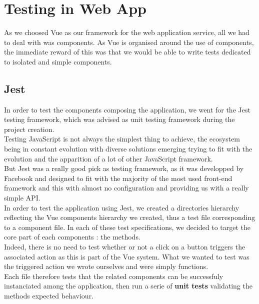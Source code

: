 \documentclass{eplmastersthesis}
\begin{document}
    \section{Testing in Web App}

      As we choosed Vue as our framework for the web application service,
      all we had to deal with was components. As Vue is organised around
      the use of components, the immediate reward of this was that we would
      be able to write tests dedicated to isolated and simple components.

      \subsection{Jest}

        In order to test the components composing the application, we
        went for the Jest \cite{jest} testing framework, which was advised
        as unit testing framework during the project creation.\\

        Testing JavaScript is not always the simplest thing to achieve, the
        ecosystem being in constant evolution with diverse solutions emerging
        trying to fit with the evolution and the apparition of a lot of
        other JavaScript framework.\\
        But Jest was a really good pick as testing framework, as it was
        developped by Facebook and designed to fit with the majority of the
        most used front-end framework and this with almost no configuration and
        providing us with a really simple API.\\

        In order to test the application using Jest, we created a directories
        hierarchy reflecting the Vue components hierarchy we created, thus
        a test file corresponding to a component file. In each of these
        test specifications, we decided to target the core part of each
        components : the methods.\\
        Indeed, there is no need to test whether or not a click on a button
        triggers the associated action as this is part of the Vue system. What
        we wanted to test was the triggered action we wrote ourselves and
        were simply functions.\\
        Each file therefore tests that the related components can be
        successfuly instanciated among the application, then run a serie
        of \textbf{unit tests} validating the methods expected behaviour.
\end{document}
